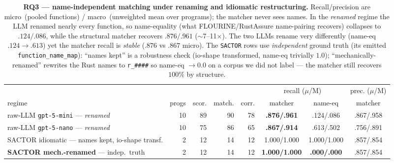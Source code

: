 \begin{table}[t]
  \centering
  \caption{\textbf{RQ3 --- name-independent matching under renaming and
    idiomatic restructuring.} Recall/precision are micro~(pooled functions) /
    macro~(unweighted mean over programs); the matcher never sees names. In the
    \emph{renamed} regime the LLM renamed nearly every function, so name-equality
    (what FLOURINE/RustAssure name-pairing recovers) collapses to $.124/.086$,
    while the structural matcher recovers $.876/.961$ ($\sim$7--11$\times$). The
    two LLMs rename very differently (name-eq $.124\!\to\!.613$) yet the matcher
    recall is \emph{stable} ($.876$ vs $.867$ micro). The \texttt{SACTOR} rows use
    \emph{independent} ground truth (its emitted \texttt{function\_name\_map}):
    ``names kept'' is a robustness check (io-shape transformed, name-eq trivially
    $1.0$); ``mechanically-renamed'' rewrites the Rust names to \texttt{r\_\#\#\#\#}
    so name-eq $\to 0.0$ on a corpus we did not label --- the matcher still
    recovers $100\%$ by structure.}
  \label{tab:rq3-matcher}
  \begin{tabular}{l r r r r cc c}
    \toprule
    & & & & & \multicolumn{2}{c}{recall ($\mu$/M)} & prec. ($\mu$/M) \\
    \cmidrule(lr){6-7}
    regime & progs & scor. & match. & corr.
      & matcher & name-eq & matcher \\
    \midrule
    raw-LLM \texttt{gpt-5-mini} --- \emph{renamed}     & 10 & 89 & 90 & 78 & \textbf{.876/.961} & .124/.086 & .867/.958 \\
    raw-LLM \texttt{gpt-5-nano} --- \emph{renamed}     & 10 & 75 & 86 & 65 & \textbf{.867/.914} & .613/.502 & .756/.891 \\
    SACTOR idiomatic --- names kept, io-shape transf.  &  2 & 12 & 14 & 12 & 1.000/1.000 & 1.000/1.000 & .857/.854 \\
    \textbf{SACTOR mech.-renamed} --- indep.\ truth     &  2 & 12 & 14 & 12 & \textbf{1.000/1.000} & \textbf{.000/.000} & .857/.854 \\
    \bottomrule
  \end{tabular}
\end{table}

